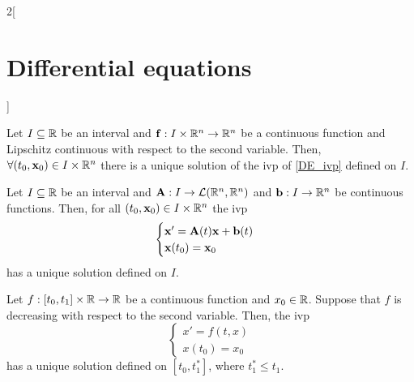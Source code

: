 \documentclass[../../../main_math.tex]{subfiles}
\begin{document}
\begin{multicols}{2}[\section{Differential equations}]
\begin{corollary}
  \end{corollary}
  \begin{proposition}
    Let $I\subseteq\mathbb{R}$ be an interval and $\boldsymbol{\mathrm{f}}:I\times\mathbb{R}^n\rightarrow\mathbb{R}^n$ be a continuous function and Lipschitz continuous with respect to the second variable. Then, $\forall(t_0,\boldsymbol{\mathrm{x}}_0)\in I\times\mathbb{R}^n$ there is a unique solution of the ivp of \cref{DE_ivp} defined on $I$.
  \end{proposition}
  \begin{corollary}
    Let $I\subseteq\mathbb{R}$ be an interval and $\boldsymbol{\mathrm{A}}:I\rightarrow\mathcal{L}(\mathbb{R}^n,\mathbb{R}^n)$ and $\boldsymbol{\mathrm{b}}:I\rightarrow\mathbb{R}^n$ be continuous functions. Then, for all $(t_0,\boldsymbol{\mathrm{x}}_0)\in I\times\mathbb{R}^n$ the ivp
    $$
      \begin{cases}
        \boldsymbol{\mathrm{x}}'=\boldsymbol{\mathrm{A}}(t)\boldsymbol{\mathrm{x}}+\boldsymbol{\mathrm{b}}(t) \\
        \boldsymbol{\mathrm{x}}(t_0)=\boldsymbol{\mathrm{x}}_0
      \end{cases}
    $$
    has a unique solution defined on $I$.
  \end{corollary}
  \begin{theorem}
    Let $f:[t_0,t_1]\times\mathbb{R}\rightarrow\mathbb{R}$ be a continuous function and $x_0\in \mathbb{R}$. Suppose that $f$ is decreasing with respect to the second variable. Then, the ivp
    \begin{equation*}
      \begin{cases}
        x'=f(t,x) \\
        x(t_0)=x_0
      \end{cases}
    \end{equation*}
    has a unique solution defined on $[t_0,t_1^*]$, where $t_1^*\leq t_1$.
  \end{theorem}

\end{multicols}
\end{document}
